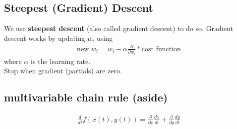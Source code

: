 \documentclass[12pt]{article}
\newcommand{\bt}[1]{\textbf{#1}} %
\newcommand{\eq}[1]{\begin{align*}#1\end{align*}} %
\newcommand{\eq}[1]{\begin{align*}#1\end{align*}} %
\begin{document}
\subsection*{Steepest (Gradient) Descent}
We use \bt{steepest descent} (also called gradient descent) to do so.
Gradient descent works by updating $w_i$ using
\eq{\text{new } w_i = w_i - \alpha \frac{\partial}{\partial w_i} * \text{cost function}}
where $\alpha$ is the learning rate.\\

Stop when gradient (partials) are zero.
\subsection*{multivariable chain rule (aside)}

\eq{\frac{d}{dt} f(x(t), y(t)) = \frac{\partial}{\partial x} \frac{dx}{dt} + \frac{\partial}{\partial y} \frac{dy}{dt}}
\end{document}
